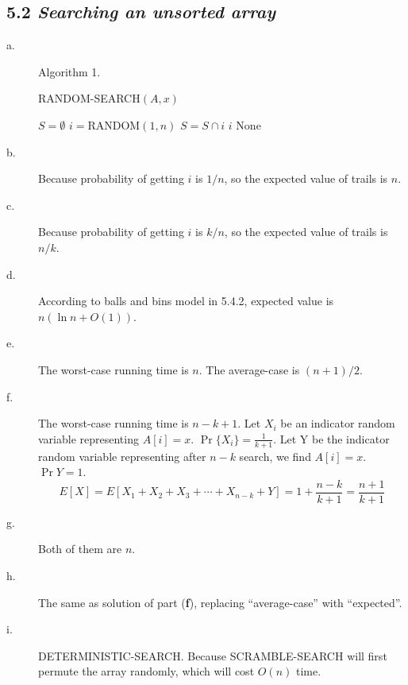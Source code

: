 \documentclass{article}
\begin{document}
\subsection*{5.2 \textit{Searching an unsorted array}}
\begin{description}
\item[a.] Algorithm 1.
\begin{algorithm}
  \caption{RANDOM-SEARCH$(A, x)$}
  \begin{algorithmic}[1]
    \STATE $S = \emptyset$ 
    \STATE $i = \textrm{RANDOM}(1, n)$
    \STATE $S = S \cap i$
    \ELSE 
    \RETURN $i$
    \ENDIF 
    \ENDWHILE
    \RETURN None
  \end{algorithmic}
\end{algorithm}

\item[b.] Because probability of getting $i$ is $1/n$, so the expected value of
trails is $n$.

\item[c.] Because probability of getting $i$ is $k/n$, so the expected value of
trails is $n/k$.

\item[d.] According to balls and bins model in 5.4.2, expected value is
  $n(\ln n+O(1))$.

\item[e.] The worst-case running time is $n$. The average-case is $(n+1)/2$.
\newpage
\item[f.] The worst-case running time is $n-k+1$. Let $X_i$ be an indicator
  random variable representing $A[i] = x$. $\Pr\{X_i\} = \frac{1}{k+1}$. Let Y be
  the indicator random variable representing after $n-k$ search, we find $A[i]
  = x$. $\Pr{Y} = 1$.
\[E[X] = E[X_1+X_2+X_3+\cdots+X_{n-k}+Y] = 1+\frac{n-k}{k+1} = \frac{n+1}{k+1}\]

\item[g.] Both of them are $n$.

\item[h.] The same as solution of part (\textbf{f}), replacing ``average-case''
  with ``expected''.

\item[i.] DETERMINISTIC-SEARCH. Because SCRAMBLE-SEARCH will first permute the
  array randomly, which will cost $O(n)$ time.
\end{description}
\end{document}
